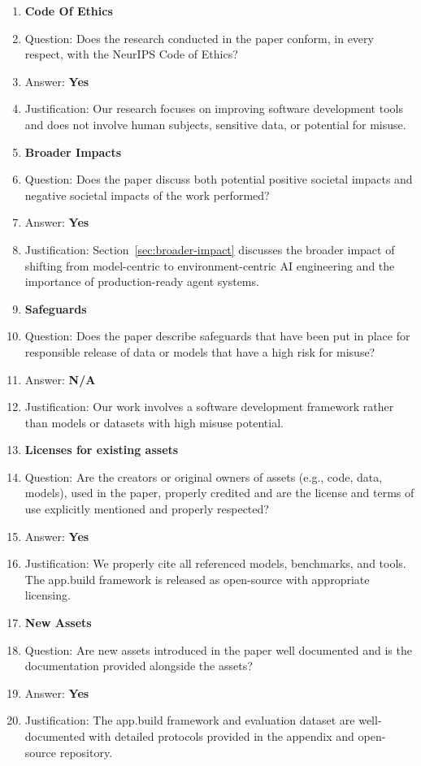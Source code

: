 \documentclass{article}
\begin{document}
\begin{enumerate}
\item {\bf Code Of Ethics}
    \item[] Question: Does the research conducted in the paper conform, in every respect, with the NeurIPS Code of Ethics?
    \item[] Answer: \textbf{Yes}
    \item[] Justification: Our research focuses on improving software development tools and does not involve human subjects, sensitive data, or potential for misuse.

\item {\bf Broader Impacts}
    \item[] Question: Does the paper discuss both potential positive societal impacts and negative societal impacts of the work performed?
    \item[] Answer: \textbf{Yes}
    \item[] Justification: Section~\ref{sec:broader-impact} discusses the broader impact of shifting from model-centric to environment-centric AI engineering and the importance of production-ready agent systems.

\item {\bf Safeguards}
    \item[] Question: Does the paper describe safeguards that have been put in place for responsible release of data or models that have a high risk for misuse?
    \item[] Answer: \textbf{N/A}
    \item[] Justification: Our work involves a software development framework rather than models or datasets with high misuse potential.

\item {\bf Licenses for existing assets}
    \item[] Question: Are the creators or original owners of assets (e.g., code, data, models), used in the paper, properly credited and are the license and terms of use explicitly mentioned and properly respected?
    \item[] Answer: \textbf{Yes}
    \item[] Justification: We properly cite all referenced models, benchmarks, and tools. The app.build framework is released as open-source with appropriate licensing.

\item {\bf New Assets}
    \item[] Question: Are new assets introduced in the paper well documented and is the documentation provided alongside the assets?
    \item[] Answer: \textbf{Yes}
    \item[] Justification: The app.build framework and evaluation dataset are well-documented with detailed protocols provided in the appendix and open-source repository.


\end{enumerate}
\end{document}
